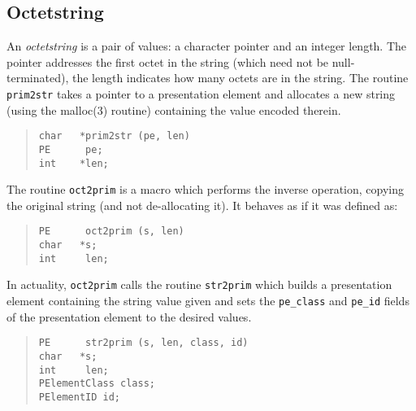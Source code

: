 \subsection	{Octetstring}
An {\em octetstring\/} is a pair of values:
a character pointer and an integer length.
The pointer addresses the first octet in the string
(which need not be null-terminated),
the length indicates how many octets are in the string.
The routine \verb"prim2str" takes a pointer to a presentation element and
allocates a new string (using the \man malloc(3) routine)
containing the value encoded therein.
\begin{quote}\small\begin{verbatim}
char   *prim2str (pe, len)
PE      pe;
int    *len;
\end{verbatim}\end{quote}
The routine \verb"oct2prim" is a macro which performs the inverse operation,
copying the original string (and not de-allocating it).
It behaves as if it was defined as:
\begin{quote}\small\begin{verbatim}
PE      oct2prim (s, len)
char   *s;
int     len;
\end{verbatim}\end{quote}
In actuality,
\verb"oct2prim" calls the routine \verb"str2prim" which builds a presentation
element containing the string value given and sets the \verb"pe_class" and
\verb"pe_id" fields of the presentation element to the desired values.
\begin{quote}\small\begin{verbatim}
PE      str2prim (s, len, class, id)
char   *s;
int     len;
PElementClass class;
PElementID id;
\end{verbatim}\end{quote}

